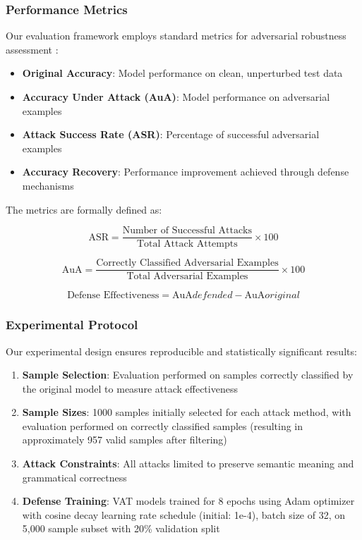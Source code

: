 \documentclass[../main.tex]{subfiles}
\begin{document}
\subsubsection{Performance Metrics}

Our evaluation framework employs standard metrics for adversarial robustness assessment \cite{morris2020textattack}:

\begin{itemize}
\item \textbf{Original Accuracy}: Model performance on clean, unperturbed test data
\item \textbf{Accuracy Under Attack (AuA)}: Model performance on adversarial examples
\item \textbf{Attack Success Rate (ASR)}: Percentage of successful adversarial examples
\item \textbf{Accuracy Recovery}: Performance improvement achieved through defense mechanisms
\end{itemize}

The metrics are formally defined as:

\begin{equation}
\text{ASR} = \frac{\text{Number of Successful Attacks}}{\text{Total Attack Attempts}} \times 100%
\end{equation}

\begin{equation}
\text{AuA} = \frac{\text{Correctly Classified Adversarial Examples}}{\text{Total Adversarial Examples}} \times 100%
\end{equation}

\begin{equation}
\text{Defense Effectiveness} = \text{AuA}{defended} - \text{AuA}{original}
\end{equation}

\subsubsection{Experimental Protocol}

Our experimental design ensures reproducible and statistically significant results:

\begin{enumerate}
\item \textbf{Sample Selection}: Evaluation performed on samples correctly classified by the original model to measure attack effectiveness
\item \textbf{Sample Sizes}: 1000 samples initially selected for each attack method, with evaluation performed on correctly classified samples (resulting in approximately 957 valid samples after filtering)

\item \textbf{Attack Constraints}: All attacks limited to preserve semantic meaning and grammatical correctness
\item \textbf{Defense Training}: VAT models trained for 8 epochs using Adam optimizer with cosine decay learning rate schedule (initial: 1e-4), batch size of 32, on 5,000 sample subset with 20\% validation split

\end{enumerate}
\end{document}
